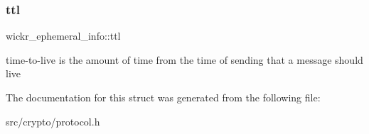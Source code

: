\subsubsection{\texorpdfstring{ttl}{ttl}}
{\footnotesize\ttfamily wickr\+\_\+ephemeral\+\_\+info\+::ttl}

time-\/to-\/live is the amount of time from the time of sending that a message should live 

The documentation for this struct was generated from the following file\+:\begin{DoxyCompactItemize}
\item 
src/crypto/protocol.\+h\end{DoxyCompactItemize}
